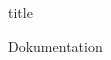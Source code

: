 \documentclass{article}
\begin{document}
{title}

\frontmatter

\tableofcontents

\listoffigures

\mainmatter

{Dokumentation}




\end{document}
